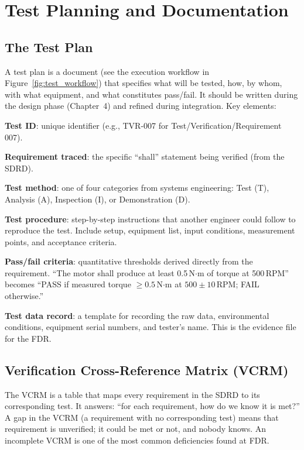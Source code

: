 \section{Test Planning and Documentation}
\subsection{The Test Plan}
A test plan is a document (see the execution workflow in Figure~\ref{fig:test_workflow}) that specifies what will be tested, how, by whom, with what equipment, and what constitutes pass/fail. It should be written during the design phase (Chapter~4) and refined during integration. Key elements:

\textbf{Test ID}: unique identifier (e.g., TVR-007 for Test/Verification/Requirement 007).

\textbf{Requirement traced}: the specific ``shall'' statement being verified (from the SDRD).

\textbf{Test method}: one of four categories from systems engineering: Test (T), Analysis (A), Inspection (I), or Demonstration (D).

\textbf{Test procedure}: step-by-step instructions that another engineer could follow to reproduce the test. Include setup, equipment list, input conditions, measurement points, and acceptance criteria.

\textbf{Pass/fail criteria}: quantitative thresholds derived directly from the requirement. ``The motor shall produce at least 0.5\,N$\cdot$m of torque at 500\,RPM'' becomes ``PASS if measured torque $\geq 0.5$\,N$\cdot$m at $500 \pm 10$\,RPM; FAIL otherwise.''

\textbf{Test data record}: a template for recording the raw data, environmental conditions, equipment serial numbers, and tester's name. This is the evidence file for the FDR.

\subsection{Verification Cross-Reference Matrix (VCRM)}
The VCRM is a table that maps every requirement in the SDRD to its corresponding test. It answers: ``for each requirement, how do we know it is met?'' A gap in the VCRM (a requirement with no corresponding test) means that requirement is unverified; it could be met or not, and nobody knows. An incomplete VCRM is one of the most common deficiencies found at FDR.

